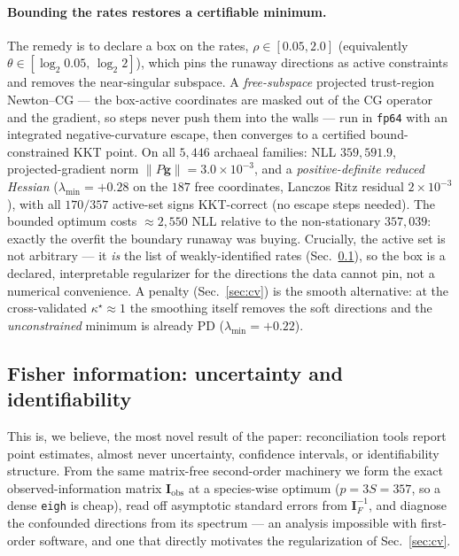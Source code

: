 \documentclass[11pt]{article}
\newcommand{\Fish}{\mathbf{I}}
\newcommand{\grad}{\mathbf{g}}
\begin{document}
\paragraph{Bounding the rates restores a certifiable minimum.}
The remedy is to declare a box on the rates, $\rho\in[0.05,2.0]$ (equivalently
$\theta\in[\log_2 0.05,\,\log_2 2]$), which pins the runaway directions as active
constraints and removes the near-singular subspace. A \emph{free-subspace}
projected trust-region Newton--CG --- the box-active coordinates are masked out
of the CG operator and the gradient, so steps never push them into the walls ---
run in \texttt{fp64} with an integrated negative-curvature escape, then converges
to a certified bound-constrained KKT point. On all $5{,}446$ archaeal families:
NLL $359{,}591.9$, projected-gradient norm $\|P\grad\|=3.0\!\times\!10^{-3}$, and
a \emph{positive-definite reduced Hessian} ($\lambda_{\min}=+0.28$ on the $187$
free coordinates, Lanczos Ritz residual $2\!\times\!10^{-3}$), with all $170/357$
active-set signs KKT-correct (no escape steps needed). The bounded optimum costs
$\approx\!2{,}550$ NLL relative to the non-stationary $357{,}039$: exactly the
overfit the boundary runaway was buying. Crucially, the active set is not
arbitrary --- it \emph{is} the list of weakly-identified rates
(Sec.~\ref{sec:fisher}), so the box is a declared, interpretable regularizer for
the directions the data cannot pin, not a numerical convenience. A penalty
(Sec.~\ref{sec:cv}) is the smooth alternative: at the cross-validated
$\kappa^\star\!\approx\!1$ the smoothing itself removes the soft directions and
the \emph{unconstrained} minimum is already PD ($\lambda_{\min}=+0.22$).

\subsection{Fisher information: uncertainty and identifiability}
\label{sec:fisher}
This is, we believe, the most novel result of the paper: reconciliation tools
report point estimates, almost never uncertainty, confidence intervals, or
identifiability structure. From the same matrix-free second-order machinery we
form the exact observed-information matrix $\Fish_{\mathrm{obs}}$ at a species-wise
optimum ($p=3S=357$, so a dense \texttt{eigh} is cheap), read off asymptotic
standard errors from $\Fish_F^{-1}$, and diagnose the confounded directions from
its spectrum --- an analysis impossible with first-order software, and one that
directly motivates the regularization of Sec.~\ref{sec:cv}.
\end{document}
